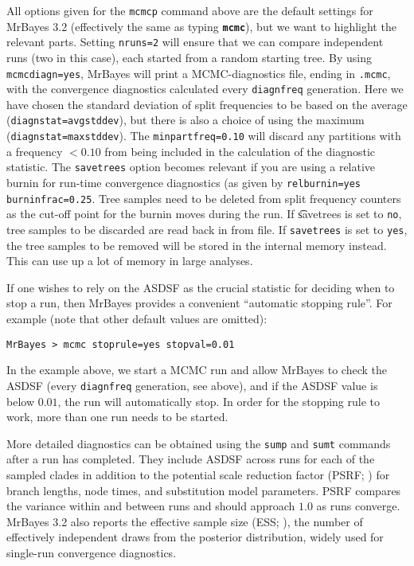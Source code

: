 \documentclass[12pt]{book}
\newcommand{\ttt}[1]{\texttt{#1}}
\newcommand{\tb}[1]{\ttt{\textbf{#1}}}
\begin{document}
All options given for the \texttt{mcmcp} command above are the default settings for MrBayes 3.2
(effectively the same as typing \tb{mcmc}), but we want to highlight the relevant parts. Setting
\texttt{nruns=2} will ensure that we can compare independent runs (two in this case), each started
from a random starting tree. By using \texttt{mcmcdiagn=yes}, MrBayes will print a MCMC-diagnostics
file, ending in \texttt{.mcmc}, with the convergence diagnostics calculated every
\texttt{diagnfreq} generation. Here we have chosen the standard deviation of split frequencies to
be based on the average (\texttt{diagnstat=avgstddev}), but there is also a choice of using the
maximum (\texttt{diagnstat=maxstddev}). The \texttt{minpartfreq=0.10} will discard any partitions
with a frequency $<0.10$ from being included in the calculation of the diagnostic statistic. The
\texttt{savetrees} option becomes relevant if you are using a relative burnin for run-time
convergence diagnostics (as given by \texttt{relburnin=yes burninfrac=0.25}. Tree samples need to
be deleted from split frequency counters as the cut-off point for the burnin moves during the run.
If \t{savetrees} is set to \texttt{no}, tree samples to be discarded are read back in from file. If
\texttt{savetrees} is set to \texttt{yes}, the tree samples to be removed will be stored in the
internal memory instead.  This can use up a lot of memory in large analyses.

If one wishes to rely on the ASDSF as the crucial statistic for deciding when to stop a run, then
MrBayes provides a convenient ``automatic stopping rule''. For example (note that other default
values are omitted):

\begin{Verbatim}
MrBayes > mcmc stoprule=yes stopval=0.01
\end{Verbatim}

In the example above, we start a MCMC run and allow MrBayes to check the ASDSF (every
\texttt{diagnfreq} generation, see above), and if the ASDSF value is below $0.01$, the run will
automatically stop. In order for the stopping rule to work, more than one run needs to be started.

More detailed diagnostics can be obtained using the \texttt{sump} and \texttt{sumt} commands after
a run has completed. They include ASDSF across runs for each of the sampled clades in addition to
the potential scale reduction factor (PSRF; \citep{gelman92}) for branch lengths, node times, and
substitution model parameters. PSRF compares the variance within and between runs and should
approach $1.0$ as runs converge. MrBayes 3.2 also reports the effective sample size (ESS;
\citep{ripley87}), the number of effectively independent draws from the posterior distribution,
widely used for single-run convergence diagnostics.
\end{document}
